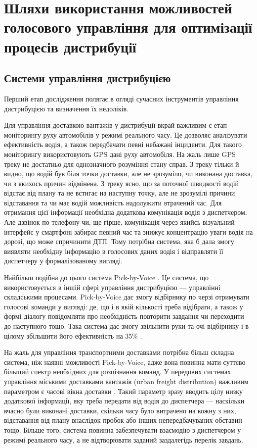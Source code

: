 \section{Шляхи використання можливостей голосового управління для оптимізації процесів дистрибуції}
\subsection{Системи управління дистрибуцією}
Перший етап дослідження полягає в огляді сучасних інструментів управління дистрибуцією та визначення їх недоліків.

Для управління доставкою вантажів у дистрибуції вкрай важливим є етап моніторингу руху автомобілів у режимі реального часу. Це дозволяє аналізувати ефективність водія, а також передбачати певні небажані інциденти. Для такого моніторингу використовують GPS дані руху автомобіля\cite{Gonzalez_2013,Comendador_2012}. На жаль лише GPS треку не достатньо для однозначного розуміння стану справ. З треку тільки й видно, що водій був біля точки доставки, але не зрозуміло, чи виконана доставка, чи з якихось причин відмінена. З треку ясно, що за поточної швидкості водій відстає від плану та не встигає на наступну точку, але не зрозумілі причини відставання та чи має водій можливість надолужити втрачений час. Для отримання цієї інформації необхідна додаткова комунікація водія з диспетчером. Але дзвінок по телефону чи, ще гірше, комунікація через якийсь візуальний інтерфейс у смартфоні забирає певний час та знижує концентрацію уваги водія на дорозі, що може спричинити ДТП. Тому потрібна система, яка б дала змогу виявляти необхідну інформацію в голосових даних водія і відправляти її диспетчеру у формалізованому вигляді.

Найбільш подібна до цього система Pick-by-Voice \cite{Pick-to-Voice}. Це система, що використовується в іншій сфері управління дистрибуцією — управлінні складськими процесами. Pick-by-Voice дає змогу відбірнику по черзі отримувати голосові команди у вигляді: де, що і в якій кількості треба відібрати, а також у формі діалогу повідомляти про необхідність повторити завдання чи переходити до наступного тощо. Така система дає змогу звільнити руки та очі відбірнику і в цілому збільшити його ефективність на 35\% \cite{Baumann_2012}.

На жаль для управління транспортними доставками потрібна більш складна система, ніж наявні можливості Pick-by-Voice, адже вона повинна мати суттєво більший спектр необхідних для розпізнання команд. У передових системах управління міськими доставками вантажів (urban freight distribution) важливим параметром є часові вікна доставки \cite{Quak_2006}. Такий параметр зразу вводить цілу низку додаткової інформації, яку треба передати від водія до диспетчера — наскільки вчасно були виконані доставки, скільки часу було витрачено на кожну з них, відставання від плану внаслідок пробок або інших непередбачуваних обставин тощо. Більше того, система повинна забезпечувати взаємодію з диспетчером у режимі реального часу, а не відтворювати заданий заздалегідь перелік завдань.

